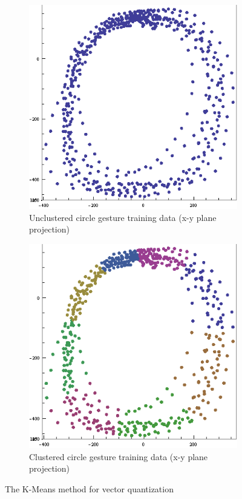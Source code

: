 \begin{figure}
        \centering
        \begin{subfigure}[b]{0.3\textwidth}
                \centering
                \includegraphics[width=\textwidth]{ThesisFigs/unclusteredCircleGesture}
                \caption{Unclustered circle gesture training data (x-y plane projection)}
                \label{fig:unclust}
        \end{subfigure} 
        \begin{subfigure}[b]{0.3\textwidth}
                \centering
                \includegraphics[width=\textwidth]{ThesisFigs/clusteredCircleGesture}
                \caption{Clustered circle gesture training data (x-y plane projection)}
                \label{fig:clust}
        \end{subfigure}
        \caption{The K-Means method for vector quantization}\label{fig:kmeans}
\end{figure}

